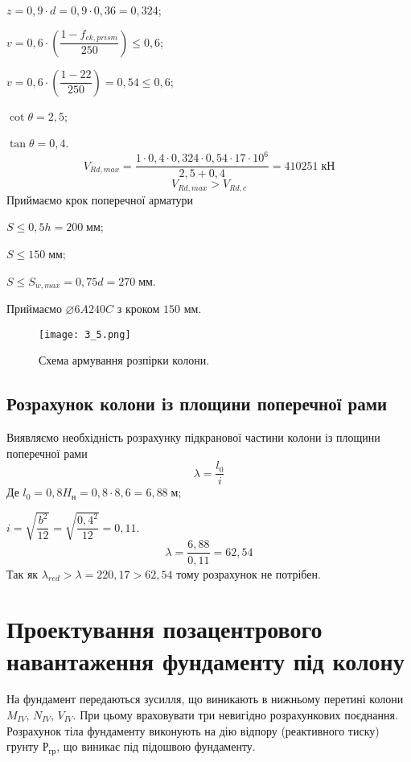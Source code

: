\documentclass[a4paper,14pt]{article}
\begin{document}
\begin{enumerate}
        $z = 0,9 \cdot d = 0,9 \cdot 0,36 = 0,324$;

        $v = 0,6 \cdot \left(\dfrac{1 - f_{ck,prism}}{250}\right) \leq 0,6$;

        $v = 0,6 \cdot \left(\dfrac{1 - 22}{250}\right) = 0,54 \leq 0,6$;

        $\cot\theta = 2,5$;

        $\tan\theta = 0,4$.
        $$ V_{Rd,max} = \dfrac{1 \cdot 0,4 \cdot 0,324 \cdot 0,54 \cdot 17 \cdot 10^6}{2,5 + 0,4} = 410251\;\textit{кН}$$
        $$V_{Rd,max} > V_{Rd,c}$$
        Приймаємо крок поперечної арматури

        $S \leq 0,5h = 200\;\textit{мм}$;

        $S \leq 150\;\textit{мм}$;
        
        $S \leq S_{w,max} = 0,75d = 270\;\textit{мм}$.
        
        Приймаємо $\varnothing6A240C$ з кроком $150$ мм.
    \end{enumerate}
    \begin{figure}[h!]
        \begin{center}
            \texttt{[image: 3\_5.png]}
            \caption{Схема армування розпірки колони.}\label{ris3_5} 
        \end{center}
    \end{figure}    
\subsection{Розрахунок колони із площини поперечної рами}
Виявляємо необхідність розрахунку підкранової частини колони із площини поперечної рами 
\begin{equation}
    \lambda = \dfrac{l_0}{i}
\end{equation}
Де $l_0 = 0,8H_\textit{н} = 0,8 \cdot 8,6 = 6,88\;\textit{м}$;

$i=\sqrt{\dfrac{b^2}{12}} = \sqrt{\dfrac{0,4^2}{12}} = 0,11$.
$$\lambda = \dfrac{6,88}{0,11} = 62,54$$
Так як $\lambda_{red}>\lambda=220,17>62,54$ тому розрахунок не потрібен.
\newpage
\section{Проектування позацентрового навантаження фундаменту під колону}

На фундамент передаються зусилля, що виникають в нижньому перетині колони $M_{IV}$, $N_{IV}$, $V_{IV}$. При цьому враховувати три невигідно розрахункових поєднання. Розрахунок тіла фундаменту виконують на дію відпору (реактивного тиску) грунту $Р_{гр}$, що виникає під підошвою фундаменту.
\end{document}
